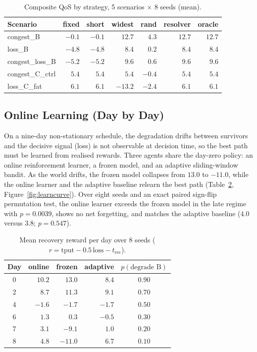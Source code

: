 \documentclass[12pt,a4paper]{report}
\begin{document}
\begin{table}[t]
\centering
\footnotesize
\caption{Composite QoS by strategy, 5 scenarios $\times$ 8 seeds (mean).}
\label{tab:resolve}
\begin{tabular}{lrrrrrr}
\toprule
Scenario & fixed & short & widest & rand & \textbf{resolver} & oracle \\
\midrule
congest\_B & $-0.1$ & $-0.1$ & $12.7$ & $4.3$ & $\mathbf{12.7}$ & $12.7$ \\
loss\_B & $-4.8$ & $-4.8$ & $8.4$ & $0.2$ & $\mathbf{8.4}$ & $8.4$ \\
congest\_loss\_B & $-5.2$ & $-5.2$ & $9.6$ & $0.6$ & $\mathbf{9.6}$ & $9.6$ \\
congest\_C\_ctrl & $5.4$ & $5.4$ & $5.4$ & $-0.4$ & $\mathbf{5.4}$ & $5.4$ \\
loss\_C\_fat & $6.1$ & $6.1$ & $-13.2$ & $-2.4$ & $\mathbf{6.1}$ & $6.1$ \\
\bottomrule
\end{tabular}
\end{table}

\subsection{Online Learning (Day by Day)}
On a nine-day non-stationary schedule, the degradation drifts between survivors and the
decisive signal (loss) is not observable at decision time, so the best path must be learned
from realised rewards. Three agents share the day-zero policy: an online reinforcement
learner, a frozen model, and an adaptive sliding-window bandit. As the world drifts, the
frozen model collapses from $13.0$ to $-11.0$, while the online learner and the adaptive
baseline relearn the best path (Table~\ref{tab:learn}, Figure~\ref{fig:learncurve}). Over
eight seeds and an exact paired sign-flip permutation test, the online learner exceeds the
frozen model in the late regime with $p=0.0039$, shows no net forgetting, and matches the
adaptive baseline ($4.0$ versus $3.8$; $p=0.547$). %

\begin{table}[t]
\centering
\footnotesize
\caption{Mean recovery reward per day over 8 seeds
($r=\text{tput}-0.5\,\text{loss}-t_{\text{rec}}$).}
\label{tab:learn}
\begin{tabular}{crrrc}
\toprule
Day & online & frozen & adaptive & $p(\text{degrade B})$ \\
\midrule
0 & $10.2$ & $13.0$ & $8.4$ & $0.90$ \\
2 & $8.7$ & $11.3$ & $9.1$ & $0.70$ \\
4 & $-1.6$ & $-1.7$ & $-1.7$ & $0.50$ \\
6 & $1.3$ & $0.3$ & $-0.5$ & $0.30$ \\
7 & $3.1$ & $-9.1$ & $1.0$ & $0.20$ \\
8 & $4.8$ & $-11.0$ & $6.7$ & $0.10$ \\
\bottomrule
\end{tabular}
\end{table}
\end{document}
